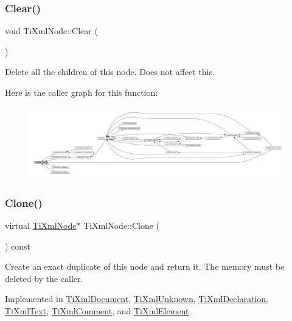\subsubsection{\texorpdfstring{Clear()}{Clear()}}
{\footnotesize\ttfamily void Ti\+Xml\+Node\+::\+Clear (\begin{DoxyParamCaption}{ }\end{DoxyParamCaption})}



Delete all the children of this node. Does not affect \textquotesingle{}this\textquotesingle{}. 

Here is the caller graph for this function\+:
\nopagebreak
\begin{figure}[H]
\begin{center}
\leavevmode
\includegraphics[width=350pt]{class_ti_xml_node_a708e7f953df61d4d2d12f73171550a4b_icgraph}
\end{center}
\end{figure}
\mbox{\label{class_ti_xml_node_a4508cc3a2d7a98e96a54cc09c37a78a4}} 
\subsubsection{\texorpdfstring{Clone()}{Clone()}}
{\footnotesize\ttfamily virtual \hyperlink{class_ti_xml_node}{Ti\+Xml\+Node}$\ast$ Ti\+Xml\+Node\+::\+Clone (\begin{DoxyParamCaption}{ }\end{DoxyParamCaption}) const\hspace{0.3cm}{\ttfamily [pure virtual]}}

Create an exact duplicate of this node and return it. The memory must be deleted by the caller. 

Implemented in \hyperlink{class_ti_xml_document_a46a4dda6c56eb106d46d4046ae1e5353}{Ti\+Xml\+Document}, \hyperlink{class_ti_xml_unknown_a3dea7689de5b1931fd6657992948fde0}{Ti\+Xml\+Unknown}, \hyperlink{class_ti_xml_declaration_a35dc1455f69b79e81cae28e186944610}{Ti\+Xml\+Declaration}, \hyperlink{class_ti_xml_text_a98a20d7a4f1c1478e25e34921be24bfe}{Ti\+Xml\+Text}, \hyperlink{class_ti_xml_comment_a1f9f06e2ed3f77875093436193b16c16}{Ti\+Xml\+Comment}, and \hyperlink{class_ti_xml_element_a810ea8fa40844c01334e5af2a26794cb}{Ti\+Xml\+Element}.

